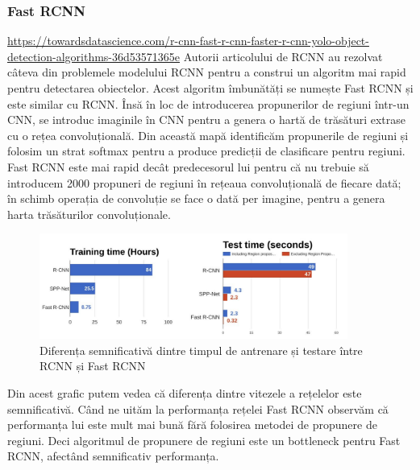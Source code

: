 \subsubsection{Fast RCNN}
\url{https://towardsdatascience.com/r-cnn-fast-r-cnn-faster-r-cnn-yolo-object-detection-algorithms-36d53571365e}
Autorii articolului de RCNN au rezolvat câteva din problemele modelului RCNN pentru a construi un algoritm mai rapid pentru detectarea obiectelor. Acest algoritm îmbunătăți se numește Fast RCNN și este similar cu RCNN. Însă în loc de introducerea propunerilor de regiuni într-un CNN, se introduc imaginile în CNN pentru a genera o hartă de trăsături extrase cu o rețea convoluțională. Din această mapă identificăm propunerile de regiuni și folosim un strat softmax pentru a produce predicții de clasificare pentru regiuni.\newline
Fast RCNN este mai rapid decât predecesorul lui pentru că nu trebuie să introducem 2000 propuneri de regiuni în rețeaua convoluțională de fiecare dată; în schimb operația de convoluție se face o dată per imagine, pentru a genera harta trăsăturilor convoluționale.

\begin{figure}[h!]
    	\centering
	\captionsetup{justification=centering, margin=2cm}
	\includegraphics[width=0.9\textwidth]{figures/rcnn_vs_fast_rcnn_time.png}
	\caption{Diferența semnificativă dintre timpul de antrenare și testare între RCNN și Fast RCNN \cite{rcnn_vs_fast_rcnn}}
	\label{fig:class_detect_segment}
\end{figure}
Din acest grafic putem vedea că diferența dintre vitezele a rețelelor este semnificativă. Când ne uităm la performanța rețelei Fast RCNN observăm că performanța lui este mult mai bună fără folosirea metodei de propunere de regiuni. Deci algoritmul de propunere de regiuni este un bottleneck pentru Fast RCNN, afectând semnificativ performanța.

